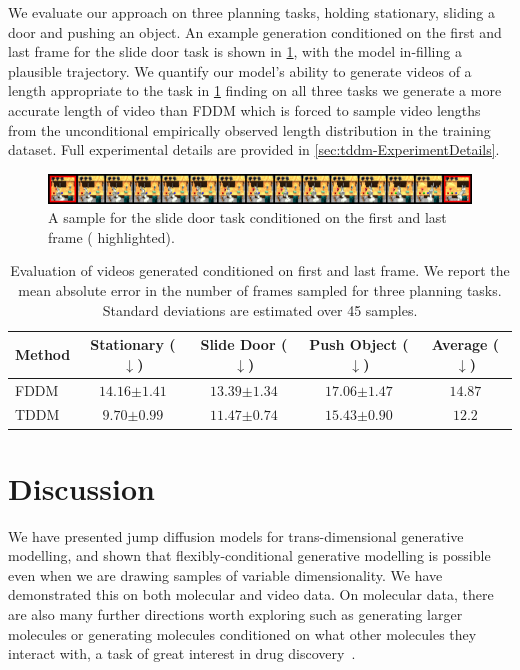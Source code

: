 We evaluate our approach on three planning tasks, holding stationary, sliding a door and pushing an object. An example generation conditioned on the first and last frame for the slide door task is shown in \cref{fig:tddm-video_example}, with the model in-filling a plausible trajectory. We quantify our model's ability to generate videos of a length appropriate to the task in \cref{tab:video_results} finding on all three tasks we generate a more accurate length of video than FDDM which is forced to sample video lengths from the unconditional empirically observed length distribution in the training dataset. Full experimental details are provided in \cref{sec:tddm-ExperimentDetails}.


\begin{figure}[t]
    \centering
    \includegraphics[width=\textwidth]{figs/tddm/21-1-padded_red_big.png}
    \caption{A sample for the slide door task conditioned on the first and last frame ({\color{red} highlighted}).}
    \label{fig:tddm-video_example}
\end{figure}

\begin{table}[t]
     \centering
   \caption{Evaluation of videos generated conditioned on first and last frame. We report the mean absolute error in the number of frames sampled
   for three planning tasks. Standard deviations are estimated over 45 samples.}
   \begin{tabular}{@{}lcccc@{}}
     \toprule
     Method & Stationary ($\downarrow$) & Slide Door ($\downarrow$) & Push Object ($\downarrow$) & Average ($\downarrow$)   \\ \midrule
     FDDM & $14.16 {\scriptstyle \pm 1.41}$ & $13.39 {\scriptstyle \pm 1.34}$ & $17.06 {\scriptstyle \pm 1.47}$ & $14.87$ \\
     TDDM & $\mathbf{9.70 {\scriptstyle \pm 0.99}}$ & $\mathbf{11.47 {\scriptstyle \pm 0.74}}$ & $\mathbf{15.43 {\scriptstyle \pm 0.90}}$ & $\mathbf{12.2}$ \\ \bottomrule
   \end{tabular}
   \label{tab:video_results}
\end{table}


\section{Discussion}
We have presented jump diffusion models for trans-dimensional generative modelling, and shown that flexibly-conditional generative modelling is possible even when we are drawing samples of variable dimensionality. We have demonstrated this on both molecular and video data. On molecular data, there are also many further directions worth exploring such as generating larger molecules or generating molecules conditioned on what other molecules they interact with, a task of great interest in drug discovery~\citep{hoogeboom2022equivariant}. 

